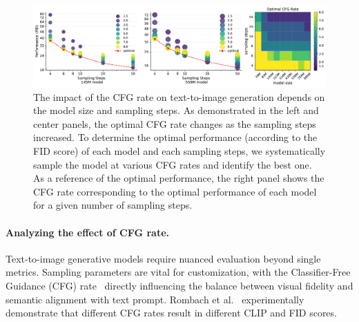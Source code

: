 \begin{figure}[ht]
    \centering
    \includegraphics[width=\linewidth]{cp2/figures/analyze_cfg_rates_v4.pdf}
    \caption{
    The impact of the CFG rate on text-to-image generation depends on the model size and sampling steps. As demonstrated in the left and center panels, the optimal CFG rate changes as the sampling steps increased.
    To determine the optimal performance (according to the FID score) of each model and each sampling steps, we systematically sample the model at various CFG rates and identify the best one. As a reference of the optimal performance, the right panel shows the CFG rate corresponding to the optimal performance of each model for a given number of sampling steps.
    }
    \label{fig:cfgrate}
\end{figure}

\paragraph{Analyzing the effect of CFG rate.}
Text-to-image generative models require nuanced evaluation beyond single metrics. Sampling parameters are vital for customization, with the Classifier-Free Guidance (CFG) rate~\cite{ho2022classifier} directly influencing the balance between visual fidelity and semantic alignment with text prompt. Rombach et al.~\cite{rombach2022high} experimentally demonstrate that different CFG rates result in different CLIP and FID scores.


